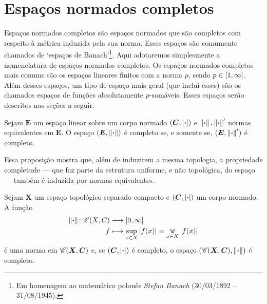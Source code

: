 \section{Espaços normados completos}

Espaços normados completos são espaços normados que são completos com respeito à métrica induzida pela sua norma. Esses espaços são comumente chamados de `espaços de Banach'\footnote{Em homenagem ao matemático polonês \emph{Stefan Banach} (30/03/1892 -- 31/08/1945).}. Aqui adotaremos simplesmente a nomenclatura de espaços normados completos. Os espaços normados completos mais comuns são os espaços lineares finitos com a norma $p$, sendo $p \in \left[{1},{\infty}\right]$. Além desses espaços, um tipo de espaço mais geral (que inclui esses) são os chamados espaços de funções absolutamente $p$-somáveis. Esses espaços serão descritos nas seções a seguir.


\begin{proposition}
Sejam $\bm E$ um espaço linear sobre um corpo normado $(\bm C,\left\vert{\bm{\cdot}}\right\vert)$ e $\left\Vert{\bm{\cdot}}\right\Vert, \left\Vert{\bm{\cdot}}\right\Vert'$ normas equivalentes em $\bm E$. O espaço $(\bm E,\left\Vert{\bm{\cdot}}\right\Vert)$ é completo se, e somente se, $(\bm E,\left\Vert{\bm{\cdot}}\right\Vert')$ é completo.
\end{proposition}

Essa proposição mostra que, além de induzirem a mesma topologia, a propriedade completude --- que faz parte da estrutura uniforme, e não topológica, do espaço --- também é induzida por normas equivalentes.

\begin{proposition}
Sejam $\bm X$ um espaço topológico separado compacto e $(\bm C,\left\vert{\bm{\cdot}}\right\vert)$ um corpo normado. A função
	\begin{align*}
	\func{\nor{\var}}{\Cont(X,C)}{\intfa{0}{\infty}}{f}{\sup_{x \in X} \abs{f(x)} = \max_{x \in X} \abs{f(x)}}
	\end{align*}
é uma norma em $\mathscr{C}(\bm X,\bm C)$ e, se $(\bm C,\left\vert{\bm{\cdot}}\right\vert)$ é completo, o espaço $(\mathscr{C}(\bm X,\bm C),\left\Vert{\bm{\cdot}}\right\Vert)$ é completo.
\end{proposition}




